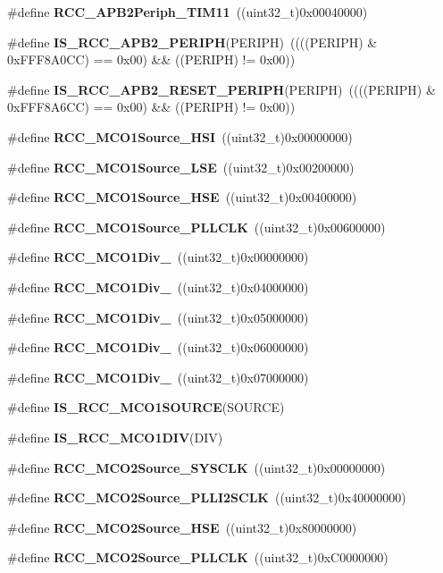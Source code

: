 \begin{DoxyCompactItemize}
\item 
\#define \textbf{ R\+C\+C\+\_\+\+A\+P\+B2\+Periph\+\_\+\+T\+I\+M11}~((uint32\+\_\+t)0x00040000)
\item 
\#define \textbf{ I\+S\+\_\+\+R\+C\+C\+\_\+\+A\+P\+B2\+\_\+\+P\+E\+R\+I\+PH}(P\+E\+R\+I\+PH)~((((P\+E\+R\+I\+PH) \& 0x\+F\+F\+F8\+A0\+C\+C) == 0x00) \&\& ((\+P\+E\+R\+I\+P\+H) != 0x00))
\item 
\#define \textbf{ I\+S\+\_\+\+R\+C\+C\+\_\+\+A\+P\+B2\+\_\+\+R\+E\+S\+E\+T\+\_\+\+P\+E\+R\+I\+PH}(P\+E\+R\+I\+PH)~((((P\+E\+R\+I\+PH) \& 0x\+F\+F\+F8\+A6\+C\+C) == 0x00) \&\& ((\+P\+E\+R\+I\+P\+H) != 0x00))
\item 
\#define \textbf{ R\+C\+C\+\_\+\+M\+C\+O1\+Source\+\_\+\+H\+SI}~((uint32\+\_\+t)0x00000000)
\item 
\#define \textbf{ R\+C\+C\+\_\+\+M\+C\+O1\+Source\+\_\+\+L\+SE}~((uint32\+\_\+t)0x00200000)
\item 
\#define \textbf{ R\+C\+C\+\_\+\+M\+C\+O1\+Source\+\_\+\+H\+SE}~((uint32\+\_\+t)0x00400000)
\item 
\#define \textbf{ R\+C\+C\+\_\+\+M\+C\+O1\+Source\+\_\+\+P\+L\+L\+C\+LK}~((uint32\+\_\+t)0x00600000)
\item 
\#define \textbf{ R\+C\+C\+\_\+\+M\+C\+O1\+Div\+\_}~((uint32\+\_\+t)0x00000000)
\item 
\#define \textbf{ R\+C\+C\+\_\+\+M\+C\+O1\+Div\+\_}~((uint32\+\_\+t)0x04000000)
\item 
\#define \textbf{ R\+C\+C\+\_\+\+M\+C\+O1\+Div\+\_}~((uint32\+\_\+t)0x05000000)
\item 
\#define \textbf{ R\+C\+C\+\_\+\+M\+C\+O1\+Div\+\_}~((uint32\+\_\+t)0x06000000)
\item 
\#define \textbf{ R\+C\+C\+\_\+\+M\+C\+O1\+Div\+\_}~((uint32\+\_\+t)0x07000000)
\item 
\#define \textbf{ I\+S\+\_\+\+R\+C\+C\+\_\+\+M\+C\+O1\+S\+O\+U\+R\+CE}(S\+O\+U\+R\+CE)
\item 
\#define \textbf{ I\+S\+\_\+\+R\+C\+C\+\_\+\+M\+C\+O1\+D\+IV}(D\+IV)
\item 
\#define \textbf{ R\+C\+C\+\_\+\+M\+C\+O2\+Source\+\_\+\+S\+Y\+S\+C\+LK}~((uint32\+\_\+t)0x00000000)
\item 
\#define \textbf{ R\+C\+C\+\_\+\+M\+C\+O2\+Source\+\_\+\+P\+L\+L\+I2\+S\+C\+LK}~((uint32\+\_\+t)0x40000000)
\item 
\#define \textbf{ R\+C\+C\+\_\+\+M\+C\+O2\+Source\+\_\+\+H\+SE}~((uint32\+\_\+t)0x80000000)
\item 
\#define \textbf{ R\+C\+C\+\_\+\+M\+C\+O2\+Source\+\_\+\+P\+L\+L\+C\+LK}~((uint32\+\_\+t)0x\+C0000000)

\end{DoxyCompactItemize}
